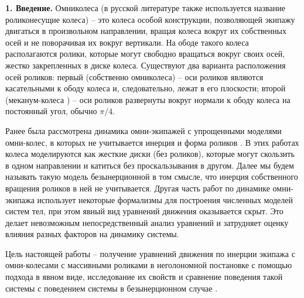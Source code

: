 {\bf 1. Введение.}
Омниколеса (в русской литературе также используется название роликонесущие колеса) -- это колеса особой конструкции, позволяющей экипажу двигаться в произвольном направлении, вращая колеса вокруг их собственных осей и не поворачивая их вокруг вертикали. На ободе такого колеса располагаются ролики, которые могут свободно вращаться вокруг своих осей, жестко закрепленных в диске колеса. Существуют два варианта расположения осей роликов: первый  (собственно омниколеса) -- оси роликов являются касательными к ободу колеса и, следовательно, лежат в его плоскости; второй (меканум-колеса \cite{mecanum}) -- оси роликов развернуты вокруг нормали к ободу колеса на постоянный угол, обычно $\pi/4$.

Ранее была рассмотрена динамика омни-экипажей с упрощенными моделями омни-колес, в которых не учитывается инерция и форма роликов \cite{ZobovaTatarinovPMM, formalskii, borisov, ZobovaTatarinovAspecty2006, zobova2008svobodnye8020851, Martynenko2010}. В этих работах колеса моделируются как жесткие диски (без роликов), которые могут скользить в одном направлении и катиться без проскальзывания в другом. Далее мы будем называть такую модель безынерционной в том смысле, что инерция собственного вращения роликов в ней не учитывается. Другая часть работ по динамике омни-экипажа \cite{KosenkoGerasimov, Tobolar, Williams2002, Ashmore2002} использует некоторые формализмы для построения численных моделей систем тел, при этом явный вид уравнений движения оказывается скрыт. Это делает невозможным непосредственный  анализ уравнений и затрудняет оценку влияния разных факторов на динамику системы.


Цель настоящей работы -- получение уравнений движения по инерции экипажа с омни-колесами с массивными роликами в неголономной постановке с помощью подхода \cite{Tatarinov} в явном виде, исследование их свойств и сравнение поведения такой системы с поведением системы в безынерционном случае \cite{Zobova2011}.